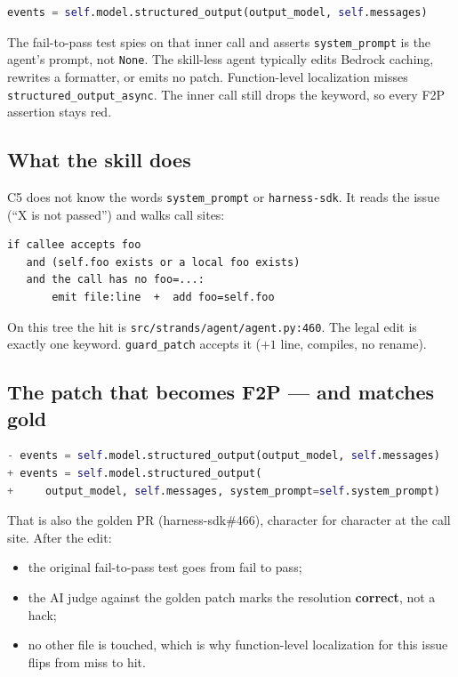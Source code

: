 \documentclass[11pt,a4paper]{article}
\begin{document}
\begin{lstlisting}[language=Python]
events = self.model.structured_output(output_model, self.messages)
\end{lstlisting}

The fail-to-pass test spies on that inner call and asserts
\texttt{system\_prompt} is the agent's prompt, not
\texttt{None}. The skill-less agent typically edits Bedrock
caching, rewrites a formatter, or emits no patch. Function-level
localization misses \texttt{structured\_output\_async}. The
inner call still drops the keyword, so every F2P assertion
stays red.

\subsection{What the skill does}

C5 does not know the words \texttt{system\_prompt} or
\texttt{harness-sdk}. It reads the issue (``X is not passed'')
and walks call sites:

\begin{lstlisting}
if callee accepts foo
   and (self.foo exists or a local foo exists)
   and the call has no foo=...:
       emit file:line  +  add foo=self.foo
\end{lstlisting}

On this tree the hit is
\texttt{src/strands/agent/agent.py:460}. The legal edit is
exactly one keyword. \texttt{guard\_patch} accepts it ($+1$
line, compiles, no rename).

\subsection{The patch that becomes F2P --- and matches gold}

\begin{lstlisting}[language=Python]
- events = self.model.structured_output(output_model, self.messages)
+ events = self.model.structured_output(
+     output_model, self.messages, system_prompt=self.system_prompt)
\end{lstlisting}

That is also the golden PR (harness-sdk\#466), character for
character at the call site. After the edit:

\begin{itemize}[leftmargin=1.2em,itemsep=2pt]
\item the original fail-to-pass test goes from fail to pass;
\item the AI judge against the golden patch marks the resolution
      \textbf{correct}, not a hack;
\item no other file is touched, which is why function-level
      localization for this issue flips from miss to hit.
\end{itemize}
\end{document}
